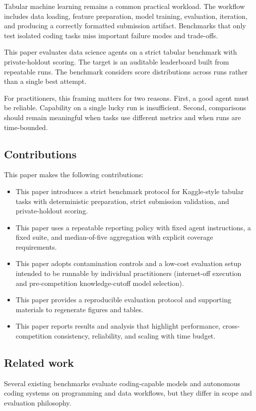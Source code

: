 Tabular machine learning remains a common practical workload. The workflow includes data loading, feature preparation, model training, evaluation, iteration, and producing a correctly formatted submission artifact. Benchmarks that only test isolated coding tasks miss important failure modes and trade-offs.

This paper evaluates data science agents on a strict tabular benchmark with private-holdout scoring. The target is an auditable leaderboard built from repeatable runs. The benchmark considers score distributions across runs rather than a single best attempt.

For practitioners, this framing matters for two reasons. First, a good agent must be reliable. Capability on a single lucky run is insufficient. Second, comparisons should remain meaningful when tasks use different metrics and when runs are time-bounded.

\subsection*{Contributions}
This paper makes the following contributions:
\begin{itemize}
  \item This paper introduces a strict benchmark protocol for Kaggle-style tabular tasks with deterministic preparation, strict submission validation, and private-holdout scoring.
  \item This paper uses a repeatable reporting policy with fixed agent instructions, a fixed suite, and median-of-five aggregation with explicit coverage requirements.
  \item This paper adopts contamination controls and a low-cost evaluation setup intended to be runnable by individual practitioners (internet-off execution and pre-competition knowledge-cutoff model selection).
  \item This paper provides a reproducible evaluation protocol and supporting materials to regenerate figures and tables.
  \item This paper reports results and analysis that highlight performance, cross-competition consistency, reliability, and scaling with time budget.
\end{itemize}

\subsection*{Related work}
Several existing benchmarks evaluate coding-capable models and autonomous coding systems on programming and data workflows, but they differ in scope and evaluation philosophy.

